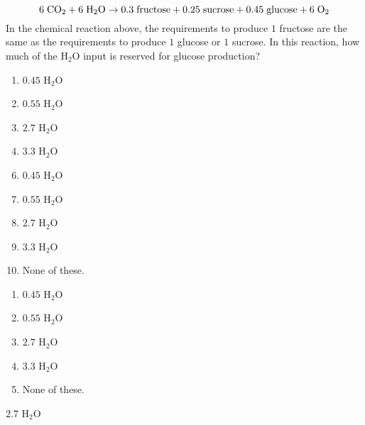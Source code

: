  
{\small$$6\hspace{1mm} \mathrm{CO}_2 + 6\hspace{1mm} \mathrm{H_2O}
 \rightarrow 0.3\hspace{1mm}\mathrm{fructose} +0.25\hspace{1mm}\mathrm{sucrose}+ 0.45\hspace{1mm}\mathrm{glucose} +6\hspace{1mm} \mathrm{O_2} $$ }
In the chemical reaction above, the requirements to produce $1$ fructose are the same as the requirements to produce $1$ glucose or $1$ sucrose.  In this reaction, how much of the H$_2$O input is reserved for glucose production?  


\ifsat
	\begin{enumerate}[label=\Alph*)]
		\item $0.45$ H$_2$O
		\item $0.55$ H$_2$O
		\item $2.7$ H$_2$O %
		\item $3.3$ H$_2$O
	\end{enumerate}
\else
\fi

\ifacteven
	\begin{enumerate}[label=\textbf{\Alph*.},itemsep=\fill,align=left]
		\setcounter{enumii}{5}
		\item $0.45$ H$_2$O
		\item $0.55$ H$_2$O
		\item $2.7$ H$_2$O %
		\addtocounter{enumii}{1}
		\item $3.3$ H$_2$O
		\item None of these. 
	\end{enumerate}
\else
\fi

\ifactodd
	\begin{enumerate}[label=\textbf{\Alph*.},itemsep=\fill,align=left]
		\item $0.45$ H$_2$O
		\item $0.55$ H$_2$O
		\item $2.7$ H$_2$O %
		\item $3.3$ H$_2$O
		\item None of these. 
	\end{enumerate}
\else
\fi

\ifgridin
 $2.7$ H$_2$O %
		
\else
\fi

